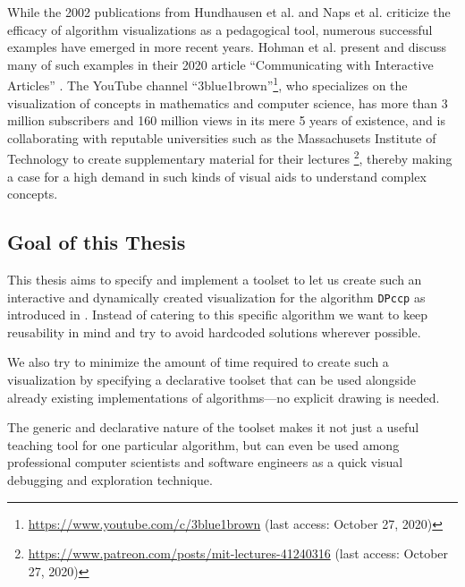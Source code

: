 
While the 2002 publications from Hundhausen et al. \cite{hundhausen2002meta} and Naps et al. \cite{naps2002exploring} criticize the efficacy of algorithm visualizations as a pedagogical tool, numerous successful examples have emerged in more recent years.
Hohman et al. present and discuss many of such examples in their 2020 article ``Communicating with Interactive Articles'' \cite{hohman2020communicating}.
The YouTube channel ``3blue1brown''\footnote{\url{https://www.youtube.com/c/3blue1brown} (last access: October 27, 2020)}, who specializes on the visualization of concepts in mathematics and computer science, has more than 3 million subscribers and 160 million views in its mere 5 years of existence, and is collaborating with reputable universities such as the Massachusets Institute of Technology to create supplementary material for their lectures \footnote{\url{https://www.patreon.com/posts/mit-lectures-41240316} (last access: October 27, 2020)}, thereby making a case for a high demand in such kinds of visual aids to understand complex concepts.

\subsection{Goal of this Thesis}
This thesis aims to specify and implement a toolset to let us create such an interactive and dynamically created visualization for the algorithm \texttt{DPccp} as introduced in \cite{moerkotte2006analysis}. Instead of catering to  this specific algorithm we want to keep reusability in mind and try to avoid hardcoded solutions wherever possible.

We also try to minimize the amount of time required to create such a visualization by specifying a declarative toolset that can be used alongside already existing implementations of algorithms—no explicit drawing is needed.

The generic and declarative nature of the toolset makes it not just a useful teaching tool for one particular algorithm, but can even be used among professional computer scientists and software engineers as a quick visual debugging and exploration technique.


